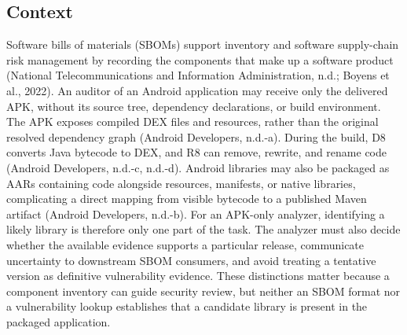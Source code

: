 \documentclass[10pt,twocolumn]{article}
\begin{document}
\subsection{Context}
Software bills of materials (SBOMs) support inventory and software supply-chain risk management by recording the components that make up a software product (National Telecommunications and Information Administration, n.d.; Boyens et al., 2022). An auditor of an Android application may receive only the delivered APK, without its source tree, dependency declarations, or build environment. The APK exposes compiled DEX files and resources, rather than the original resolved dependency graph (Android Developers, n.d.-a). During the build, D8 converts Java bytecode to DEX, and R8 can remove, rewrite, and rename code (Android Developers, n.d.-c, n.d.-d). Android libraries may also be packaged as AARs containing code alongside resources, manifests, or native libraries, complicating a direct mapping from visible bytecode to a published Maven artifact (Android Developers, n.d.-b).
For an APK-only analyzer, identifying a likely library is therefore only one part of the task. The analyzer must also decide whether the available evidence supports a particular release, communicate uncertainty to downstream SBOM consumers, and avoid treating a tentative version as definitive vulnerability evidence. These distinctions matter because a component inventory can guide security review, but neither an SBOM format nor a vulnerability lookup establishes that a candidate library is present in the packaged application.
\end{document}

